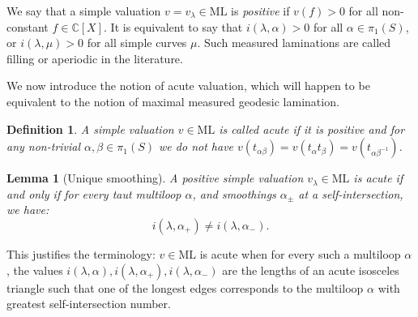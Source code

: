 \documentclass{amsart}
\newtheorem{definition}{Definition}
\newtheorem{lemma}{Lemma}
\newcommand{\C}{\mathbb{C}}
\newcommand{\ML}{\mathrm{ML}}
\begin{document}
We say that a simple valuation $v=v_\lambda\in \ML$ is \emph{positive} if $v(f)>0$ for all non-constant $f\in \C[X]$. It is equivalent to say that $i(\lambda,\alpha)>0$ for all $\alpha\in \pi_1(S)$, or $i(\lambda,\mu)>0$ for all simple curves $\mu$. Such measured laminations are called filling or aperiodic in the literature.
%

We now introduce the notion of acute valuation, 
which will happen to be equivalent to the notion of maximal measured geodesic lamination.

\begin{definition}\label{acute}
A simple valuation $v\in \ML$ is called acute if it is positive and for any non-trivial $\alpha,\beta\in \pi_1(S)$ we do not have $v(t_{\alpha\beta})=v(t_\alpha t_\beta)=v(t_{\alpha\beta^{-1}})$.
\end{definition}


\begin{lemma}[Unique smoothing]\label{uniquesmoothing}
A positive simple valuation $v_\lambda\in \ML$ is acute if and only if for every taut multiloop $\alpha$, and smoothings $\alpha_\pm$ at a self-intersection, we have:
$$i(\lambda,\alpha_+)\ne i(\lambda,\alpha_-).$$
\end{lemma}

This justifies the terminology: $v\in \ML$ is acute when for every such a multiloop $\alpha$, the values $i(\lambda,\alpha), i(\lambda,\alpha_+), i(\lambda,\alpha_-)$ are the lengths of an acute isosceles triangle such that one of the longest edges corresponds to the multiloop $\alpha$ with greatest self-intersection number.
\end{document}
